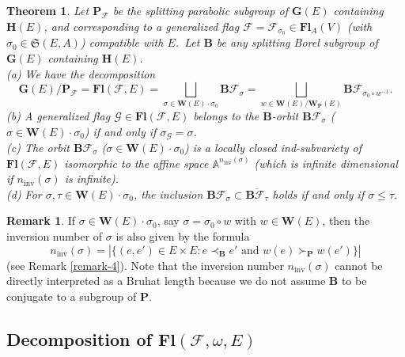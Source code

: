\documentclass[12pt]{amsart}
\newtheorem{theorem}{Theorem}
\theoremstyle{definition}
\newtheorem{remark}{Remark}
\begin{document}
\begin{theorem}
\label{theorem-1}
Let $\mathbf{P}_\mathcal{F}$ be the splitting parabolic subgroup of $\mathbf{G}(E)$ containing $\mathbf{H}(E)$, and corresponding to a generalized flag $\mathcal{F}=\mathcal{F}_{\sigma_0}\in\mathbf{Fl}_A(V)$ (with $\sigma_0\in\mathfrak{S}(E,A)$) compatible with $E$.\ Let $\mathbf{B}$ be any splitting Borel subgroup of $\mathbf{G}(E)$ containing $\mathbf{H}(E)$. \\
{\rm (a)} We have the decomposition
\[\mathbf{G}(E)/\mathbf{P}_\mathcal{F}=\mathbf{Fl}(\mathcal{F},E)=\bigsqcup_{\sigma\in\mathbf{W}(E)\cdot\sigma_0}\mathbf{B}\mathcal{F}_\sigma=\bigsqcup_{w\in \mathbf{W}(E)/\mathbf{W}_\mathbf{P}(E)}\mathbf{B}\mathcal{F}_{\sigma_0\circ w^{-1}}.\]
{\rm (b)}
A generalized flag $\mathcal{G}\in\mathbf{Fl}(\mathcal{F},E)$ belongs to the $\mathbf{B}$-orbit $\mathbf{B}\mathcal{F}_\sigma$ ($\sigma\in\mathbf{W}(E)\cdot\sigma_0$) if and only if $\sigma_\mathcal{G}=\sigma$. \\
{\rm (c)} The orbit $\mathbf{B}\mathcal{F}_\sigma$ ($\sigma\in\mathbf{W}(E)\cdot\sigma_0$) is a locally closed ind-subvariety of $\mathbf{Fl}(\mathcal{F},E)$ isomorphic to the affine space $\mathbb{A}^{n_\mathrm{inv}(\sigma)}$ (which is infinite dimensional if $n_\mathrm{inv}(\sigma)$ is infinite). \\
{\rm (d)} For $\sigma,\tau\in\mathbf{W}(E)\cdot\sigma_0$, the inclusion $\mathbf{B}\mathcal{F}_\sigma\subset\overline{\mathbf{B}\mathcal{F}_\tau}$ holds if and only if $\sigma\leq\tau$.
\end{theorem}

\begin{remark}
If $\sigma\in\mathbf{W}(E)\cdot\sigma_0$, say $\sigma=\sigma_0\circ w$ with $w\in\mathbf{W}(E)$, then the inversion number of $\sigma$ is also given by the formula
\[n_\mathrm{inv}(\sigma)=|\{(e,e')\in E\times E:e\prec_\mathbf{B}e'\mbox{ and }w(e)\succ_\mathbf{P}w(e')\}|\]
(see Remark \ref{remark-4}). Note that the inversion number $n_\mathrm{inv}(\sigma)$ cannot be directly interpreted as a Bruhat length because we do not assume  $\mathbf{B}$ to be conjugate to a subgroup of $\mathbf{P}$.
\end{remark}


\subsection{Decomposition of $\mathbf{Fl}(\mathcal{F},\omega,E)$}

\label{section-4-2}
\end{document}
